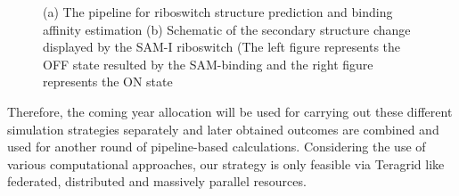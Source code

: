 \documentclass[a4paper,10pt]{article}
\begin{document}
\begin{figure}
\begin{center}
\end{center}
\caption{(a) The pipeline for riboswitch structure prediction and binding affinity estimation (b) Schematic of the secondary structure change displayed by the SAM-I riboswitch (The left figure represents the OFF state resulted by the SAM-binding and the right figure represents the ON state}
\label{fig:ribo-pipeline}
\end{figure}

Therefore, the coming year allocation will be used for carrying out these different simulation strategies separately and later obtained outcomes are combined and used for another round of pipeline-based calculations.  Considering the use of various computational approaches, our strategy is only feasible via Teragrid like federated, distributed and massively parallel resources.  
\end{document}
